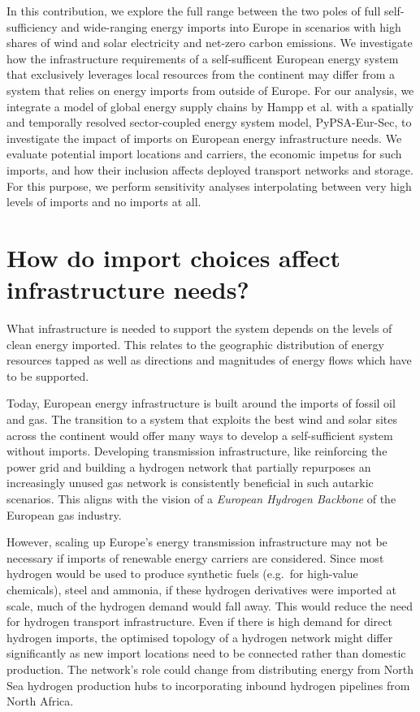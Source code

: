 \documentclass[10pt,5p,reversenotenum,lefttitle]{elsarticle}
\begin{document}
In this contribution, we explore the full range between the two poles of full
self-sufficiency and wide-ranging energy imports into Europe in scenarios with
high shares of wind and solar electricity and net-zero carbon emissions. We
investigate how the infrastructure requirements of a self-sufficent European
energy system that exclusively leverages local resources from the continent may
differ from a system that relies on energy imports from outside of Europe. For
our analysis, we integrate a model of global energy supply chains by Hampp et
al.\cite{hamppImportOptions2023} with a spatially and temporally resolved
sector-coupled energy system model,
PyPSA-Eur-Sec,\cite{PyPSAEurSecSectorCoupled} to investigate the impact of
imports on European energy infrastructure needs. We evaluate potential import
locations and carriers, the economic impetus for such imports, and how their
inclusion affects deployed transport networks and storage. For this purpose, we
perform sensitivity analyses interpolating between very high levels of imports
and no imports at all.

\section*{How do import choices affect infrastructure needs?}

What infrastructure is needed to support the system depends on the levels of
clean energy imported. This relates to the geographic distribution of energy
resources tapped as well as directions and magnitudes of energy flows which have
to be supported.

Today, European energy infrastructure is built around the imports of fossil oil
and gas. The transition to a system that exploits the best wind and solar sites
across the continent would offer many ways to develop a self-sufficient system
without imports.\cite{pickeringDiversityOptions2022,brownSynergiesSector2018}
Developing transmission infrastructure, like reinforcing the power grid and
building a hydrogen network that partially repurposes an increasingly unused gas
network is consistently beneficial in such autarkic
scenarios.\cite{neumannBenefitsHydrogen2022a,wetzelGreenEnergy2022,victoriaSpeedTechnological2022}
This aligns with the vision of a \textit{European Hydrogen Backbone} of the
European gas industry.
\cite{gasforclimateEuropeanHydrogen2020,gasforclimateEuropeanHydrogen2022}

However, scaling up Europe's energy transmission infrastructure may not be
necessary if imports of renewable energy carriers are considered. Since most
hydrogen would be used to produce synthetic fuels (e.g.~for high-value
chemicals), steel and ammonia,\cite{neumannBenefitsHydrogen2022a} if these
hydrogen derivatives were imported at scale, much of the hydrogen demand would
fall away. This would reduce the need for hydrogen transport infrastructure.
Even if there is high demand for direct hydrogen imports, the optimised topology
of a hydrogen network might differ significantly as new import locations need to
be connected rather than domestic production. The network's role could change
from distributing energy from North Sea hydrogen production hubs to
incorporating inbound hydrogen pipelines from North Africa.
\end{document}
